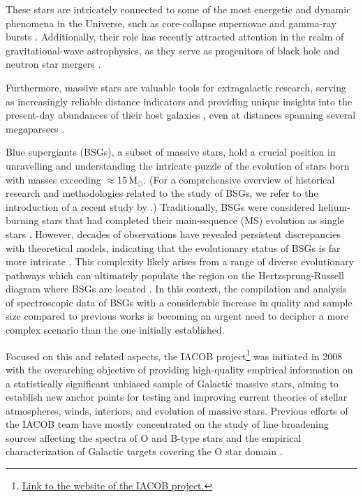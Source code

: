 \documentclass{aa}
\newcommand{\MSol}{\,\mbox{M$_\odot$}\xspace}
\begin{document}
These stars are intricately connected to some of the most energetic and dynamic phenomena in the Universe, such as core-collapse supernovae and gamma-ray bursts \citep{woosley06, smartt09}. Additionally, their role has recently attracted attention in the realm of gravitational-wave astrophysics, as they serve as progenitors of black hole and neutron star mergers \citep{abbott16, belczynski16, marchant16}.

Furthermore, massive stars are valuable tools for extragalactic research, serving as increasingly reliable distance indicators \citep{urbaneja17, taormina20} and providing unique insights into the present-day abundances of their host galaxies \citep{bresolin07, kudritzki12, bresolin16}, even at distances spanning several megaparsecs \citep{kudritzki03a, urbaneja03, urbaneja05a, kudritzki08, bresolin22}.

Blue supergiants (BSGs), a subset of massive stars, hold a crucial position in unravelling and understanding the intricate puzzle of the evolution of stars born with masses exceeding $\approx$15\MSol. (For a comprehensive overview of historical research and methodologies related to the study of BSGs, we refer to the introduction of a recent study by \citeauthor{webmayer22} \citeyear{webmayer22}.) Traditionally, BSGs were considered helium-burning stars that had completed their main-sequence (MS) evolution as single stars \citep[e.g.,][]{hayashi62}. However, decades of observations have revealed persistent discrepancies with theoretical models, indicating that the evolutionary status of BSGs is far more intricate \citep[see, e.g.,][]{fitzpatrick90, castro14, wang20}. This complexity likely arises from a range of diverse evolutionary pathways which can ultimately populate the region on the Hertzsprung-Russell diagram where BSGs are located \citep[see][]{vink10, maeder12, langer12}. In this context, the compilation and analysis of spectroscopic data of BSGs with a considerable increase in quality and sample size compared to previous works \citep[e.g.,][]{dufton72, lennon92, crowther06, lefever07, searle08, markova08, castro14, haucke18, webmayer22} is becoming an urgent need to decipher a more complex scenario than the one initially established.

Focused on this and related aspects, the IACOB project\footnote{\href{https://research.iac.es/proyecto/iacob/pages/en/introduction.php}{Link to the website of the IACOB project.}} was initiated in 2008 with the overarching objective of providing high-quality empirical information on a statistically significant unbiased sample of Galactic massive stars, aiming to establish new anchor points for testing and improving current theories of stellar atmospheres, winds, interiors, and evolution of massive stars. Previous efforts of the IACOB team have mostly concentrated on the study of line broadening sources affecting the spectra of O and B-type stars \citep[][]{simon-diaz14a, simon-diaz14b, simon-diaz17, godart17} and the empirical characterization of Galactic targets covering the O star domain \citep[][]{holgado18, holgado20, holgado22, britavskiy23}.
\end{document}

